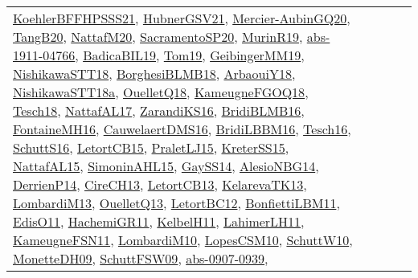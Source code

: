 {\begin{longtable}{lp{3cm}>{\raggedright}p{6cm}>{\raggedright}p{6cm}p{8cm}}
\href{articles/KoehlerBFFHPSSS21.pdf}{KoehlerBFFHPSSS21}\cite{KoehlerBFFHPSSS21}, \href{articles/HubnerGSV21.pdf}{HubnerGSV21}\cite{HubnerGSV21}, \href{papers/Mercier-AubinGQ20.pdf}{Mercier-AubinGQ20}\cite{Mercier-AubinGQ20}, \href{papers/TangB20.pdf}{TangB20}\cite{TangB20}, \href{papers/NattafM20.pdf}{NattafM20}\cite{NattafM20}, \href{articles/SacramentoSP20.pdf}{SacramentoSP20}\cite{SacramentoSP20}, \href{papers/MurinR19.pdf}{MurinR19}\cite{MurinR19}, \href{articles/abs-1911-04766.pdf}{abs-1911-04766}\cite{abs-1911-04766}, \href{papers/BadicaBIL19.pdf}{BadicaBIL19}\cite{BadicaBIL19}, \href{papers/Tom19.pdf}{Tom19}\cite{Tom19}, \href{papers/GeibingerMM19.pdf}{GeibingerMM19}\cite{GeibingerMM19}, \href{papers/NishikawaSTT18.pdf}{NishikawaSTT18}\cite{NishikawaSTT18}, \href{articles/BorghesiBLMB18.pdf}{BorghesiBLMB18}\cite{BorghesiBLMB18}, \href{papers/ArbaouiY18.pdf}{ArbaouiY18}\cite{ArbaouiY18}, \href{papers/NishikawaSTT18a.pdf}{NishikawaSTT18a}\cite{NishikawaSTT18a}, \href{papers/OuelletQ18.pdf}{OuelletQ18}\cite{OuelletQ18}, \href{papers/KameugneFGOQ18.pdf}{KameugneFGOQ18}\cite{KameugneFGOQ18}, \href{papers/Tesch18.pdf}{Tesch18}\cite{Tesch18}, \href{articles/NattafAL17.pdf}{NattafAL17}\cite{NattafAL17}, \href{articles/ZarandiKS16.pdf}{ZarandiKS16}\cite{ZarandiKS16}, \href{articles/BridiBLMB16.pdf}{BridiBLMB16}\cite{BridiBLMB16}, \href{papers/FontaineMH16.pdf}{FontaineMH16}\cite{FontaineMH16}, \href{papers/CauwelaertDMS16.pdf}{CauwelaertDMS16}\cite{CauwelaertDMS16}, \href{papers/BridiLBBM16.pdf}{BridiLBBM16}\cite{BridiLBBM16}, \href{papers/Tesch16.pdf}{Tesch16}\cite{Tesch16}, \href{papers/SchuttS16.pdf}{SchuttS16}\cite{SchuttS16}, \href{articles/LetortCB15.pdf}{LetortCB15}\cite{LetortCB15}, \href{papers/PraletLJ15.pdf}{PraletLJ15}\cite{PraletLJ15}, \href{papers/KreterSS15.pdf}{KreterSS15}\cite{KreterSS15}, \href{articles/NattafAL15.pdf}{NattafAL15}\cite{NattafAL15}, \href{articles/SimoninAHL15.pdf}{SimoninAHL15}\cite{SimoninAHL15}, \href{papers/GaySS14.pdf}{GaySS14}\cite{GaySS14}, \href{papers/AlesioNBG14.pdf}{AlesioNBG14}\cite{AlesioNBG14}, \href{papers/DerrienP14.pdf}{DerrienP14}\cite{DerrienP14}, \href{papers/CireCH13.pdf}{CireCH13}\cite{CireCH13}, \href{papers/LetortCB13.pdf}{LetortCB13}\cite{LetortCB13}, \href{papers/KelarevaTK13.pdf}{KelarevaTK13}\cite{KelarevaTK13}, \href{papers/LombardiM13.pdf}{LombardiM13}\cite{LombardiM13}, \href{papers/OuelletQ13.pdf}{OuelletQ13}\cite{OuelletQ13}, \href{papers/LetortBC12.pdf}{LetortBC12}\cite{LetortBC12}, \href{papers/BonfiettiLBM11.pdf}{BonfiettiLBM11}\cite{BonfiettiLBM11}, \href{papers/EdisO11.pdf}{EdisO11}\cite{EdisO11}, \href{articles/HachemiGR11.pdf}{HachemiGR11}\cite{HachemiGR11}, \href{articles/KelbelH11.pdf}{KelbelH11}\cite{KelbelH11}, \href{papers/LahimerLH11.pdf}{LahimerLH11}\cite{LahimerLH11}, \href{papers/KameugneFSN11.pdf}{KameugneFSN11}\cite{KameugneFSN11}, \href{papers/LombardiM10.pdf}{LombardiM10}\cite{LombardiM10}, \href{articles/LopesCSM10.pdf}{LopesCSM10}\cite{LopesCSM10}, \href{papers/SchuttW10.pdf}{SchuttW10}\cite{SchuttW10}, \href{papers/MonetteDH09.pdf}{MonetteDH09}\cite{MonetteDH09}, \href{papers/SchuttFSW09.pdf}{SchuttFSW09}\cite{SchuttFSW09}, \href{articles/abs-0907-0939.pdf}{abs-0907-0939}\cite{abs-0907-0939}, 
\end{longtable}}
